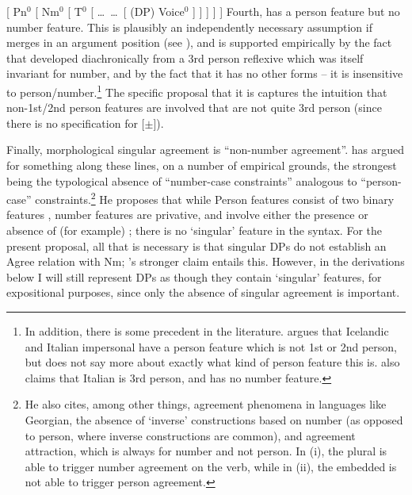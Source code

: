 \documentclass[output=paper]{langscibook}
\begin{document}
\ea
{ [ Pn$^0$ [ Nm$^0$ [ T$^0$ [ \dots\ \sti \dots\ [ (DP) Voice$^0$ ] ] ] ] ] }
\z
Fourth, \sti{} has a person feature but no number feature.  This is plausibly an  independently necessary assumption if \sti merges in an argument position (see \citealt{Wood2015book}), and is  supported empirically by the fact that \sti developed diachronically from a 3rd person reflexive which was itself invariant for number, and by the fact that it has no other forms -- it is insensitive to person/number.\footnote{In addition, there is some precedent in the literature. \citet{DAlessandro:2003oy} argues that Icelandic \sti and Italian impersonal  have a person feature which is not 1st or 2nd person, but does not say more about exactly what kind of person feature this is. \citet{Taraldsen:1995om} also claims that Italian  is 3rd person, and has no number feature.} The specific proposal that it is  captures the intuition that non-1st/2nd person features are involved that are not quite 3rd person (since there is no specification for [$\pm$]). 


Finally, morphological singular agreement is “non-number agreement”. \citet{Nevins2010:ab} has argued for something along these lines, on a number of empirical grounds, the strongest being the typological absence of “number-case constraints” analogous to “person-case” constraints.\footnote{He also cites, among other things, agreement phenomena in languages like Georgian, the absence of `inverse' constructions based on number (as opposed to person, where inverse constructions are common), and agreement attraction, which is always for number and not person.   \z In (i), the plural  is able to trigger number agreement on the verb, while in (ii), the embedded  is not able to trigger person agreement.} He proposes that while Person features consist of two binary features , number features are privative, and involve either the presence or absence of (for example) ; there is no `singular' feature in the syntax. For the present proposal, all that is necessary is that singular DPs do not establish an Agree relation with Nm; \citeauthor{Nevins2010:ab}'s stronger claim entails this. However, in the derivations below I will still represent DPs as though they contain `singular' features, for expositional purposes, since only the absence of singular agreement is important.
\end{document}
